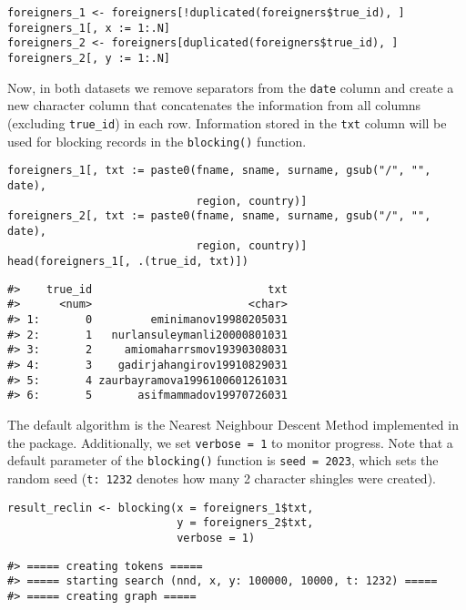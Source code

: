 \begin{verbatim}
foreigners_1 <- foreigners[!duplicated(foreigners$true_id), ]
foreigners_1[, x := 1:.N]
foreigners_2 <- foreigners[duplicated(foreigners$true_id), ]
foreigners_2[, y := 1:.N]
\end{verbatim}

Now, in both datasets we remove separators from the \texttt{date} column and
create a new character column that concatenates the information from all
columns (excluding \texttt{true\_id}) in each row. Information stored in the \texttt{txt}
column will be used for blocking records in the \texttt{blocking()} function.

\begin{verbatim}
foreigners_1[, txt := paste0(fname, sname, surname, gsub("/", "", date),
                             region, country)]
foreigners_2[, txt := paste0(fname, sname, surname, gsub("/", "", date),
                             region, country)]
head(foreigners_1[, .(true_id, txt)])
\end{verbatim}

\begin{verbatim}
#>    true_id                           txt
#>      <num>                        <char>
#> 1:       0         eminimanov19980205031
#> 2:       1   nurlansuleymanli20000801031
#> 3:       2     amiomaharrsmov19390308031
#> 4:       3    gadirjahangirov19910829031
#> 5:       4 zaurbayramova1996100601261031
#> 6:       5       asifmammadov19970726031
\end{verbatim}

The default algorithm is the Nearest Neighbour Descent Method \citep{Dong2011} implemented in
the  package. Additionally, we set \texttt{verbose\ =\ 1} to monitor progress. Note
that a default parameter of the \texttt{blocking()} function is \texttt{seed\ =\ 2023},
which sets the random seed (\texttt{t:\ 1232} denotes how many 2 character shingles were created).

\begin{verbatim}
result_reclin <- blocking(x = foreigners_1$txt,
                          y = foreigners_2$txt,
                          verbose = 1)
\end{verbatim}

\begin{verbatim}
#> ===== creating tokens =====
#> ===== starting search (nnd, x, y: 100000, 10000, t: 1232) =====
#> ===== creating graph =====
\end{verbatim}

